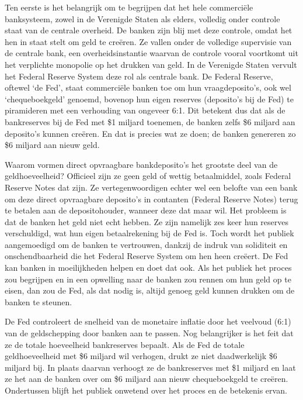 \documentclass[
  a5paper,
  smalldemyvopaper,10pt,twoside,onecolumn,openright,extrafontsizes,hidelinks]{memoir}
\begin{document}
Ten eerste is het belangrijk om te begrijpen dat het hele commerciële
banksysteem, zowel in de Verenigde Staten als elders, volledig onder
controle staat van de centrale overheid. De banken zijn blij met deze
controle, omdat het hen in staat stelt om geld te creëren. Ze vallen
onder de volledige supervisie van de centrale bank, een
overheidsinstantie waarvan de controle vooral voortkomt uit het
verplichte monopolie op het drukken van geld. In de Verenigde Staten
vervult het Federal Reserve System deze rol als centrale bank. De
Federal Reserve, oftewel `de Fed', staat commerciële banken toe om hun
vraagdeposito's, ook wel `chequeboekgeld' genoemd, bovenop hun eigen
reserves (deposito's bij de Fed) te piramideren met een verhouding van
ongeveer 6:1. Dit betekent dus dat als de bankreserves bij de Fed met
\$1 miljard toenemen, de banken zelfs \$6 miljard aan deposito's kunnen
creëren. En dat is precies wat ze doen; de banken genereren zo \$6
miljard aan nieuw geld.

Waarom vormen direct opvraagbare bankdeposito's het grootste deel van de
geldhoeveelheid? Officieel zijn ze geen geld of wettig betaalmiddel,
zoals Federal Reserve Notes dat zijn. Ze vertegenwoordigen echter wel
een belofte van een bank om deze direct opvraagbare deposito's in
contanten (Federal Reserve Notes) terug te betalen aan de
depositohouder, wanneer deze dat maar wil. Het probleem is dat de banken
het geld niet echt hebben. Ze zijn namelijk zes keer hun reserves
verschuldigd, wat hun eigen betaalrekening bij de Fed is. Toch wordt het
publiek aangemoedigd om de banken te vertrouwen, dankzij de indruk van
soliditeit en onschendbaarheid die het Federal Reserve System om hen
heen creëert. De Fed kan banken in moeilijkheden helpen en doet dat ook.
Als het publiek het proces zou begrijpen en in een opwelling naar de
banken zou rennen om hun geld op te eisen, dan zou de Fed, als dat nodig
is, altijd genoeg geld kunnen drukken om de banken te steunen.

De Fed controleert de snelheid van de monetaire inflatie door het
veelvoud (6:1) van de geldschepping door banken aan te passen. Nog
belangrijker is het feit dat ze de totale hoeveelheid bankreserves
bepaalt. Als de Fed de totale geldhoeveelheid met \$6 miljard wil
verhogen, drukt ze niet daadwerkelijk \$6 miljard bij. In plaats daarvan
verhoogt ze de bankreserves met \$1 miljard en laat ze het aan de banken
over om \$6 miljard aan nieuw chequeboekgeld te creëren. Ondertussen
blijft het publiek onwetend over het proces en de betekenis ervan.
\end{document}
